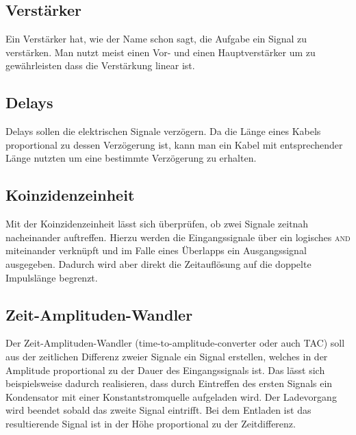 \documentclass[11pt, ngerman, fleqn, DIV=15, headinclude, BCOR=2cm]{scrreprt}
\begin{document}

\subsection{Verstärker}

Ein Verstärker hat, wie der Name schon sagt, die Aufgabe ein Signal zu
verstärken. Man nutzt meist einen Vor- und einen Hauptverstärker um zu
gewährleisten dass die Verstärkung linear ist. 

\subsection{Delays}

Delays sollen die elektrischen Signale verzögern. Da die Länge eines Kabels
proportional zu dessen Verzögerung ist, kann man ein Kabel mit entsprechender
Länge nutzten um eine bestimmte Verzögerung zu erhalten.

\subsection{Koinzidenzeinheit}

Mit der Koinzidenzeinheit lässt sich überprüfen, ob zwei Signale zeitnah
nacheinander auftreffen. Hierzu werden die Eingangssignale über ein logisches
\textsc{and} miteinander verknüpft und im Falle eines Überlapps ein Ausgangssignal
ausgegeben. Dadurch wird aber direkt die Zeitauflösung auf die doppelte
Impulslänge begrenzt.

\subsection{Zeit-Amplituden-Wandler}

Der Zeit-Amplituden-Wandler (time-to-amplitude-converter oder auch TAC) soll
aus der zeitlichen Differenz zweier Signale ein Signal erstellen, welches
in der Amplitude proportional zu der Dauer des Eingangssignals ist. Das lässt
sich beispielsweise dadurch realisieren, dass durch Eintreffen des ersten
Signals ein Kondensator mit einer Konstantstromquelle
aufgeladen wird. Der Ladevorgang wird beendet sobald das zweite Signal
eintrifft. Bei dem Entladen ist das resultierende Signal ist in der Höhe
proportional zu der Zeitdifferenz.
\end{document}
